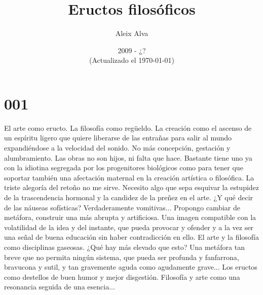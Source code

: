 \documentclass[a4paper,11pt,openright,twocolumn]{book}
\author{Aleix Alva}
\title{Eructos filosóficos}
\date{2009 - ¿? \\
\vspace {2cm} (Actualizado el \today)}
\begin{document}
\maketitle




\section*{001}

El arte como eructo. La filosofía como regüeldo. La creación como el ascenso de un espíritu ligero que quiere liberarse de las entrañas para salir al mundo expandiéndose a la velocidad del sonido. No más concepción, gestación y alumbramiento. Las obras no son hijos, ni falta que hace. Bastante tiene uno ya con la idiotina segregada por los progenitores biológicos como para tener que soportar también una afectación maternal en la creación artística o filosófica. La triste alegoría del retoño no me sirve. Necesito algo que sepa esquivar la estupidez de la trascendencia hormonal y la candidez de la preñez en el arte. ¿Y qué decir de las náuseas sofísticas? Verdaderamente vomitivas... Propongo cambiar de metáfora, construir una más abrupta y artificiosa. Una imagen compatible con la volatilidad de la idea y del instante, que pueda provocar y ofender y a la vez ser una señal de buena educación sin haber contradicción en ello. El arte y la filosofía como disciplinas gaseosas. ¿Qué hay más elevado que esto? Una metáfora tan breve que no permita ningún sistema, que pueda ser profunda y fanfarrona, bravucona y sutil, y tan gravemente aguda como agudamente grave... Los eructos como destellos de buen humor y mejor disgestión. Filosofía y arte como una resonancia seguida de una esencia...
\end{document}
